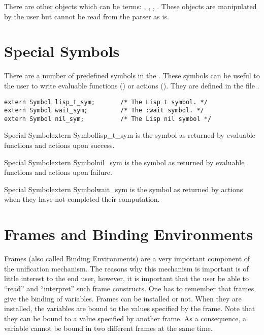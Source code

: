 There are other objects which can be terms: , ,
, . These objects are manipulated by
the user but cannot be read from the parser as is.

\section{Special Symbols}

There are a number of predefined symbols in the \CPK{}. These symbols can be
useful to the user to write evaluable functions ()
or actions (). They are defined in the file  .

\begin{verbatim}
extern Symbol lisp_t_sym;       /* The Lisp t symbol. */
extern Symbol wait_sym;         /* The :wait symbol. */
extern Symbol nil_sym;          /* The Lisp nil symbol */
\end{verbatim}

\begin{typevr}{Special Symbol}{extern Symbol}{lisp\_t\_sym}
is the  symbol as returned by evaluable functions and actions upon
success. 
\end{typevr}

\begin{typevr}{Special Symbol}{extern Symbol}{nil\_sym}
is the  symbol as returned by evaluable functions and actions upon
failure.  
\end{typevr}

\begin{typevr}{Special Symbol}{extern Symbol}{wait\_sym}
is the  symbol as returned by actions when they have not completed
their computation. 
\end{typevr}

\section{Frames and Binding Environments}

Frames (also called Binding Environments) are a very important component of the
unification mechanism. The reasons why this mechanism is important is of little
interest to the end user, however, it is important that the user be able to
``read'' and ``interpret'' such frame constructs. One has to remember that
frames give the binding of variables. Frames can be installed or not. When they
are installed, the variables are bound to the values specified by the frame.
Note that they can be bound to a value specified by another frame. As a
consequence, a variable cannot be bound in two different frames at the same
time.

